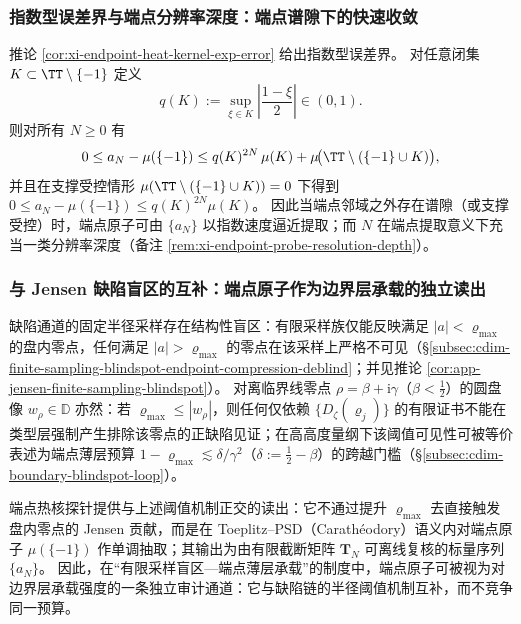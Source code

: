 \subsubsection{指数型误差界与端点分辨率深度：端点谱隙下的快速收敛}
推论 \ref{cor:xi-endpoint-heat-kernel-exp-error} 给出指数型误差界。
对任意闭集 \(K\subset\TT\setminus\{-1\}\) 定义
\[
q(K):=\sup_{\xi\in K}\left|\frac{1-\xi}{2}\right|\in(0,1).
\]
则对所有 \(N\ge 0\) 有
\[
0\le a_N-\mu(\{-1\})
\le q(K)^{2N}\,\mu(K)+\mu\!\bigl(\TT\setminus(\{-1\}\cup K)\bigr),
\]
并且在支撑受控情形 \(\mu(\TT\setminus(\{-1\}\cup K))=0\) 下得到
\(
0\le a_N-\mu(\{-1\})\le q(K)^{2N}\mu(K)
\)。
因此当端点邻域之外存在谱隙（或支撑受控）时，端点原子可由 \(\{a_N\}\) 以指数速度逼近提取；而 \(N\) 在端点提取意义下充当一类分辨率深度（备注 \ref{rem:xi-endpoint-probe-resolution-depth}）。

\subsubsection{与 Jensen 缺陷盲区的互补：端点原子作为边界层承载的独立读出}
缺陷通道的固定半径采样存在结构性盲区：有限采样族仅能反映满足 \(|a|<\varrho_{\max}\) 的盘内零点，任何满足 \(|a|>\varrho_{\max}\) 的零点在该采样上严格不可见（\S\ref{subsec:cdim-finite-sampling-blindspot-endpoint-compression-deblind}；并见推论 \ref{cor:app-jensen-finite-sampling-blindspot}）。
对离临界线零点 \(\rho=\beta+\mathrm{i}\gamma\)（\(\beta<\tfrac12\)）的圆盘像 \(w_\rho\in\mathbb{D}\) 亦然：若 \(\varrho_{\max}\le |w_\rho|\)，则任何仅依赖 \(\{D_{\zeta}(\varrho_j)\}\) 的有限证书不能在类型层强制产生排除该零点的正缺陷见证；在高高度量纲下该阈值可见性可被等价表述为端点薄层预算 \(1-\varrho_{\max}\lesssim \delta/\gamma^{2}\)（\(\delta:=\tfrac12-\beta\)）的跨越门槛（\S\ref{subsec:cdim-boundary-blindspot-loop}）。
\par
端点热核探针提供与上述阈值机制正交的读出：它不通过提升 \(\varrho_{\max}\) 去直接触发盘内零点的 Jensen 贡献，而是在 Toeplitz--PSD（Carath\'eodory）语义内对端点原子 \(\mu(\{-1\})\) 作单调抽取；其输出为由有限截断矩阵 \(\mathbf{T}_N\) 可离线复核的标量序列 \(\{a_N\}\)。
因此，在“有限采样盲区—端点薄层承载”的制度中，端点原子可被视为对边界层承载强度的一条独立审计通道：它与缺陷链的半径阈值机制互补，而不竞争同一预算。



\endinput

